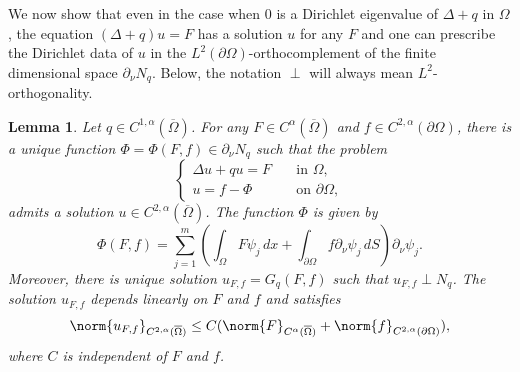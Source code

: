 \documentclass[11pt,a4paper]{amsart}
\newtheorem{Lemma}[Theorem]{Lemma}
\theoremstyle{definition}
\numberwithin{equation}{section}
\newcommand{\ol}[1]{\overline{#1}}
\newcommand{\p}{\partial}
\newcommand{\Om}{\Omega}
\begin{document}
We now show that even in the case when $0$ is a Dirichlet eigenvalue of $\Delta+q$ in $\Om$, the equation $(\Delta+q)u = F$ has a solution $u$ for any $F$ and one can prescribe the Dirichlet data of $u$ in the $L^2(\p \Om)$-orthocomplement of the finite dimensional space $\p_{\nu} N_q$. Below, the notation $\perp$ will always mean $L^2$-orthogonality.

\begin{Lemma}  \label{lemma_linearized_ri}
Let $q \in C^{1,\alpha}(\ol{\Om})$. For any $F \in C^{\alpha}(\ol{\Om})$ and $f \in C^{2,\alpha}(\p \Om)$, there is a unique function $\Phi = \Phi(F,f) \in \p_{\nu} N_q$ such that the problem  
\begin{equation}\label{eq:schrödinger}
\begin{cases}
	\Delta u + qu = F\quad&\text{in }\Omega, \\
	u = f - \Phi \quad&\text{on }\partial\Omega,
\end{cases}
\end{equation}
admits a solution $u \in C^{2,\alpha}(\ol{\Om})$. The function $\Phi$ is given by 
\begin{equation}\label{eq:finite_rank_map}
	\Phi(F, f) = \sum_{j=1}^m \left(\int_{\Om}F\psi_j\,dx + \int_{\partial\Om} f\partial_{\nu}\psi_j\,dS\right)\partial_{\nu}\psi_j.
\end{equation}
Moreover, there is unique solution $u_{F,f} = G_q(F,f)$ such that $u_{F,f} \perp N_q$. The solution $u_{F,f}$ depends linearly on $F$ and $f$ and satisfies 
\begin{equation}\label{uff_estimate}
\norm{u_{F,f}}_{C^{2,\alpha}(\ol{\Om})} \leq C(\norm{F}_{C^{\alpha}(\ol{\Om})} + \norm{f}_{C^{2,\alpha}(\p \Om)}),
\end{equation}
where $C$ is independent of $F$ and $f$.
\end{Lemma}
\end{document}
